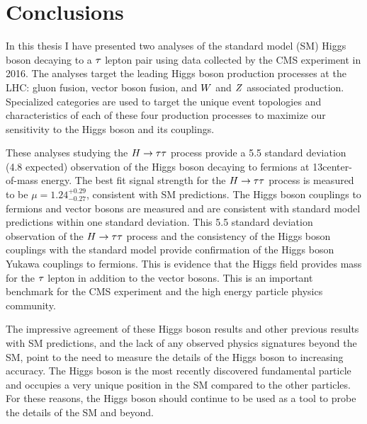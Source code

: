 \chapter{Conclusions}
\label{sec:conclusion}

In this thesis I have presented two analyses of the standard model (SM) Higgs boson decaying 
to a $\tau$ lepton pair using data collected by the CMS experiment in 2016.
The analyses target the leading Higgs boson production processes at the LHC:
gluon fusion, vector boson fusion, and $W$ and $Z$ associated production.
Specialized categories are used to target the unique event topologies and 
characteristics of each of these four production processes to maximize our
sensitivity to the Higgs boson and its couplings. 

These analyses studying the $H\to\tau\tau$ process provide a 5.5 standard deviation (4.8 expected)
observation of the Higgs boson decaying to fermions at 13\TeV center-of-mass energy. 
The best fit signal strength for the $H\to\tau\tau$ process is measured to be 
$\mu = 1.24 ^{+0.29} _{-0.27}$, consistent with SM predictions.
The Higgs boson couplings to fermions and vector bosons are measured and are 
consistent with standard model predictions within one standard deviation.
This 5.5 standard deviation observation of the $H\to\tau\tau$ process and the consistency
of the Higgs boson couplings with the standard model provide confirmation of the Higgs boson
Yukawa couplings to fermions.
This is evidence that the Higgs field provides mass
for the $\tau$ lepton in addition to the vector bosons.
This is an important benchmark for the CMS experiment and the high energy
particle physics community.

The impressive agreement of these Higgs boson results and other previous results
with SM predictions, and the lack of any observed physics signatures beyond
the SM, point to the need to measure the details of the Higgs boson to increasing
accuracy. The Higgs boson is the most recently discovered fundamental particle and occupies a very
unique position in the SM compared to the other particles. For these reasons,
the Higgs boson should continue to be used as a tool to probe the details of the SM and beyond.



